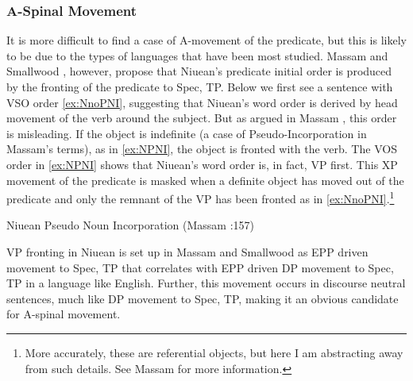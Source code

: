 \documentclass[output=paper,colorlinks,citecolor=brown,
]{langscibook}
\begin{document}

\subsubsection{A-Spinal Movement}

It is more difficult to find a case of A-movement of the predicate, but this is likely to be due to the types of languages that have been most studied.  Massam and Smallwood \citeyearpar{Massam:1997}, however, propose that Niuean's predicate initial order is produced by the fronting of the predicate to Spec, TP.  Below we first see a sentence with VSO order \ref{ex:NnoPNI}, suggesting that Niuean's word order is derived by head movement of the verb around the subject.  But as argued in Massam \citeyearpar{Massam:2001}, this order is misleading. If the object is indefinite (a case of Pseudo-Incorporation in Massam's terms), as in \ref{ex:NPNI}, the object is fronted with the verb. The VOS order in \ref{ex:NPNI} shows that Niuean's word order is, in fact, VP first.  This XP movement of the predicate is masked when a definite object has moved out of the predicate and only the remnant of the VP has been fronted as in \ref{ex:NnoPNI}.\footnote{More accurately, these are referential objects, but here I am abstracting away from such details.  See Massam \citeyearpar{Massam:2020} for more information.}


\ea[]
Niuean Pseudo Noun Incorporation (Massam \citeyear{Massam:2001}:157) \label{ex:Niuean}

VP fronting in Niuean is set up in Massam and Smallwood \citeyearpar{Massam:1997} as EPP driven movement to Spec, TP that correlates with EPP driven DP movement to Spec, TP in a language like English.  Further, this movement occurs in discourse neutral sentences, much like DP movement to Spec, TP, making it an obvious candidate for A-spinal movement. 
\end{document}
